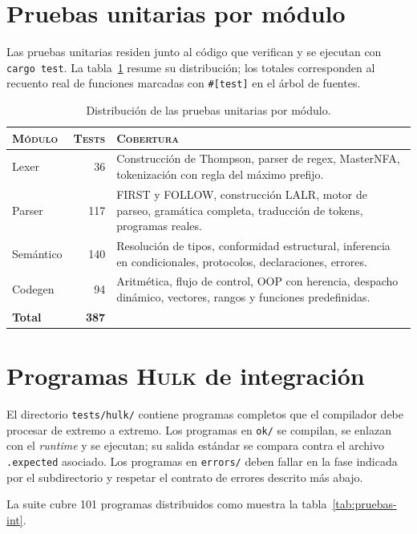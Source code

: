 \documentclass[11pt,a4paper,oneside,openany]{report}
\newcommand{\hulk}{\textsc{Hulk}}
\newcommand{\code}[1]{\texttt{#1}}
\begin{document}
\section{Pruebas unitarias por módulo}

Las pruebas unitarias residen junto al código que verifican y se ejecutan con
\code{cargo test}. La tabla~\ref{tab:pruebas} resume su distribución; los
totales corresponden al recuento real de funciones marcadas con \code{\#[test]}
en el árbol de fuentes.

\begin{table}[H]
\centering
\caption{Distribución de las pruebas unitarias por módulo.}
\label{tab:pruebas}
\begin{tabularx}{\textwidth}{lrX}
\toprule
\textsc{Módulo} & \textsc{Tests} & \textsc{Cobertura} \\
\midrule
Lexer      & 36  & Construcción de Thompson, parser de regex, MasterNFA,
                   tokenización con regla del máximo prefijo. \\
Parser     & 117 & FIRST y FOLLOW, construcción LALR, motor de parseo,
                   gramática completa, traducción de tokens, programas reales. \\
Semántico  & 140 & Resolución de tipos, conformidad estructural, inferencia
                   en condicionales, protocolos, declaraciones, errores. \\
Codegen    & 94  & Aritmética, flujo de control, OOP con herencia, despacho
                   dinámico, vectores, rangos y funciones predefinidas. \\
\midrule
\textbf{Total} & \textbf{387} & \\
\bottomrule
\end{tabularx}
\end{table}

\section{Programas \hulk{} de integración}

El directorio \code{tests/hulk/} contiene programas completos que el
compilador debe procesar de extremo a extremo. Los programas en \code{ok/} se
compilan, se enlazan con el \textit{runtime} y se ejecutan; su salida estándar
se compara contra el archivo \code{.expected} asociado. Los programas en
\code{errors/} deben fallar en la fase indicada por el subdirectorio y
respetar el contrato de errores descrito más abajo.

La suite cubre 101 programas distribuidos como muestra la
tabla~\ref{tab:pruebas-int}.
\end{document}
